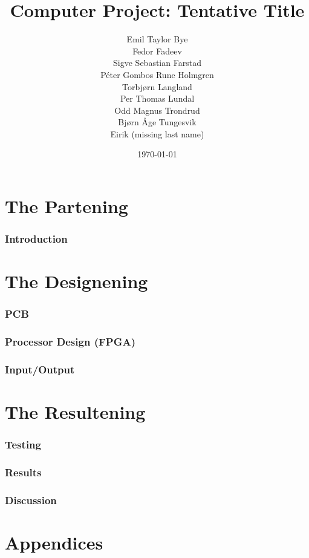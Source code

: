 \documentclass{report}
\title{Computer Project: Tentative Title}
\date{\today}
\author{Emil Taylor Bye
     \\ Fedor Fadeev
     \\ Sigve Sebastian Farstad
     \\ Péter Gombos Rune Holmgren
     \\ Torbjørn Langland
     \\ Per Thomas Lundal
     \\ Odd Magnus Trondrud
     \\ Bjørn Åge Tungesvik
     \\ Eirik (missing last name)
}
\begin{document}
\maketitle

\begin{abstract}
	
\end{abstract}

\tableofcontents

\part{The Partening}

\section{Introduction}
	


\part{The Designening}

\section{PCB}
	

\section{Processor Design (FPGA)}
	

\section{Input/Output}
	

\part{The Resultening}

\section{Testing}
	

\section{Results}
	

\section{Discussion}
	

\part{Appendices}
	
\end{document}
